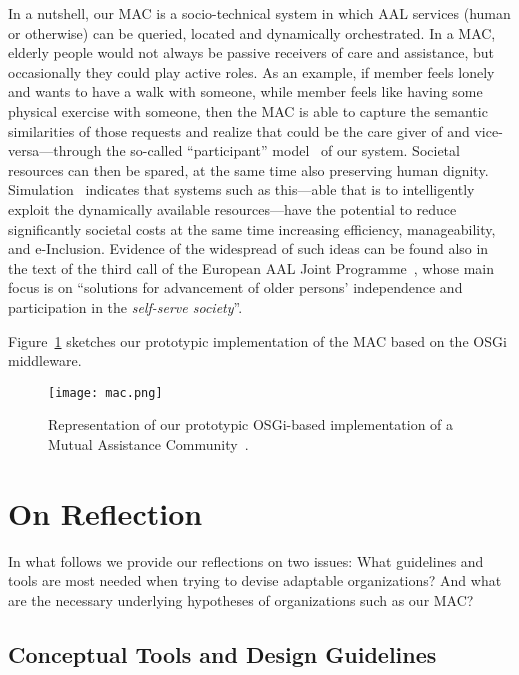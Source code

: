 \documentclass{llncs}
\begin{document}
In a nutshell, our MAC is a socio-technical system in which AAL services (human or otherwise) can be
queried, located and dynamically orchestrated. In a MAC, elderly people would not
always be passive receivers of care and assistance, but occasionally they could play active roles. As an
example, if member  feels lonely and wants to have a walk with someone, while member  feels like
having some physical exercise with someone, then the MAC is able to capture the semantic similarities of
those requests and realize that  could be the care giver of  and vice-versa---through the
so-called ``participant'' model~\cite{SDGB07a} of our system.
Societal resources can then be spared, at the same time also preserving human dignity.
Simulation~\cite{SDFB06a} indicates
that systems such as this---able that is
to intelligently exploit the dynamically available resources---have the
potential to reduce significantly societal costs at the same time increasing efficiency,
manageability, and e-Inclusion.
Evidence of the widespread of such ideas can
be found also in the text of the third call of the European AAL Joint Programme~\cite{AAL-3}, whose main
focus is on ``solutions for advancement of older persons' independence and participation in the
\emph{self-serve society}''.

Figure~\ref{f:mac} sketches our prototypic implementation of the MAC based on the OSGi middleware.
\begin{figure}[t]
\centerline{\texttt{[image: mac.png]}}
\caption{Representation of our prototypic OSGi-based implementation of a Mutual Assistance Community~\cite{SDGB10b}.}
	\label{f:mac}
\end{figure}





\section{On Reflection}\label{s:onrefl}


In what follows we provide our reflections on two issues:  What guidelines and tools are
most needed when trying to devise adaptable organizations? And what are the necessary underlying
hypotheses of organizations such as our MAC?


\subsection{Conceptual Tools and Design Guidelines}
\end{document}
